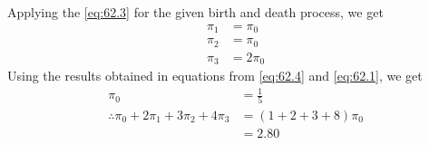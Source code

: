 \documentclass[journal,12pt,twocolumn]{IEEEtran}
\theoremstyle{remark}
\begin{document}
Applying the \eqref{eq:62.3} for the given birth and death process, we get
\begin{equation}
\label{eq:62.4}
\begin{split}
\pi_1 &= \pi_0\\
\pi_2 &= \pi_0\\
\pi_3 &= 2\pi_0
\end{split}
\end{equation}
Using the results obtained in equations from \eqref{eq:62.4} and \eqref{eq:62.1}, we get
\begin{equation}
\begin{split}
\pi_0 &= \frac{1}{5}\\
\therefore \pi_0 + 2\pi_1 + 3\pi_2 + 4\pi_3 &= (1+2+3+8)\pi_0\\
&= 2.80
\end{split}
\end{equation}
\end{document}
